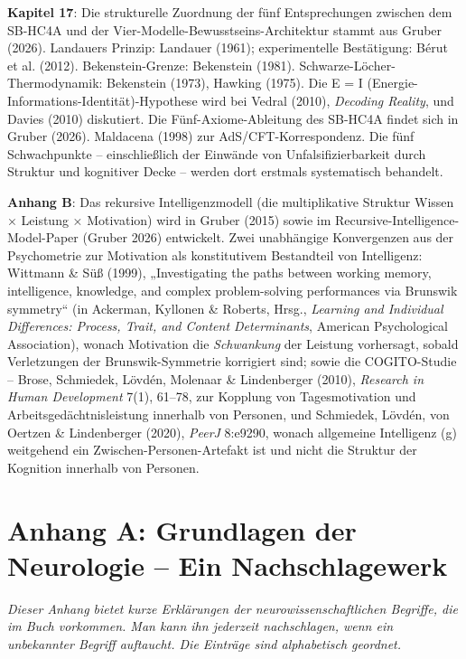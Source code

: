 \documentclass[11pt, twoside, openright]{book}
\begin{document}
\textbf{Kapitel 17}: Die strukturelle Zuordnung der fünf Entsprechungen zwischen dem SB-HC4A und der Vier-Modelle-Bewusstseins-Architektur stammt aus Gruber (2026). Landauers Prinzip: Landauer (1961); experimentelle Bestätigung: Bérut et al. (2012). Bekenstein-Grenze: Bekenstein (1981). Schwarze-Löcher-Thermodynamik: Bekenstein (1973), Hawking (1975). Die E = I (Energie-Informations-Identität)-Hypothese wird bei Vedral (2010), \textit{Decoding Reality}, und Davies (2010) diskutiert. Die Fünf-Axiome-Ableitung des SB-HC4A findet sich in Gruber (2026). Maldacena (1998) zur AdS/CFT-Korrespondenz. Die fünf Schwachpunkte -- einschließlich der Einwände von Unfalsifizierbarkeit durch Struktur und kognitiver Decke -- werden dort erstmals systematisch behandelt.

\textbf{Anhang B}: Das rekursive Intelligenzmodell (die multiplikative Struktur Wissen × Leistung × Motivation) wird in Gruber (2015) sowie im Recursive-Intelligence-Model-Paper (Gruber 2026) entwickelt. Zwei unabhängige Konvergenzen aus der Psychometrie zur Motivation als konstitutivem Bestandteil von Intelligenz: Wittmann \& Süß (1999), „Investigating the paths between working memory, intelligence, knowledge, and complex problem-solving performances via Brunswik symmetry“ (in Ackerman, Kyllonen \& Roberts, Hrsg., \textit{Learning and Individual Differences: Process, Trait, and Content Determinants}, American Psychological Association), wonach Motivation die \textit{Schwankung} der Leistung vorhersagt, sobald Verletzungen der Brunswik-Symmetrie korrigiert sind; sowie die COGITO-Studie -- Brose, Schmiedek, Lövdén, Molenaar \& Lindenberger (2010), \textit{Research in Human Development} 7(1), 61--78, zur Kopplung von Tagesmotivation und Arbeitsgedächtnisleistung innerhalb von Personen, und Schmiedek, Lövdén, von Oertzen \& Lindenberger (2020), \textit{PeerJ} 8:e9290, wonach allgemeine Intelligenz (g) weitgehend ein Zwischen-Personen-Artefakt ist und nicht die Struktur der Kognition innerhalb von Personen.

\chapter*{Anhang A: Grundlagen der Neurologie -- Ein Nachschlagewerk}

\textit{Dieser Anhang bietet kurze Erklärungen der neurowissenschaftlichen Begriffe, die im Buch vorkommen. Man kann ihn jederzeit nachschlagen, wenn ein unbekannter Begriff auftaucht. Die Einträge sind alphabetisch geordnet.}
\end{document}
